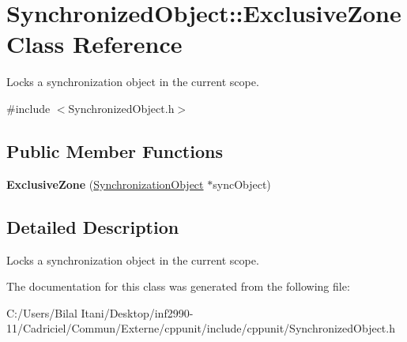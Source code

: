 \hypertarget{class_synchronized_object_1_1_exclusive_zone}{}\section{Synchronized\+Object\+:\+:Exclusive\+Zone Class Reference}
\label{class_synchronized_object_1_1_exclusive_zone}


Locks a synchronization object in the current scope.  




{\ttfamily \#include $<$Synchronized\+Object.\+h$>$}

\subsection*{Public Member Functions}
\begin{DoxyCompactItemize}
\item 
{\bfseries Exclusive\+Zone} (\hyperlink{class_synchronized_object_1_1_synchronization_object}{Synchronization\+Object} $\ast$sync\+Object)\hypertarget{class_synchronized_object_1_1_exclusive_zone_ae4393b508828328c2f4816ff9b7b090c}{}\label{class_synchronized_object_1_1_exclusive_zone_ae4393b508828328c2f4816ff9b7b090c}

\end{DoxyCompactItemize}


\subsection{Detailed Description}
Locks a synchronization object in the current scope. 

The documentation for this class was generated from the following file\+:\begin{DoxyCompactItemize}
\item 
C\+:/\+Users/\+Bilal Itani/\+Desktop/inf2990-\/11/\+Cadriciel/\+Commun/\+Externe/cppunit/include/cppunit/Synchronized\+Object.\+h\end{DoxyCompactItemize}
